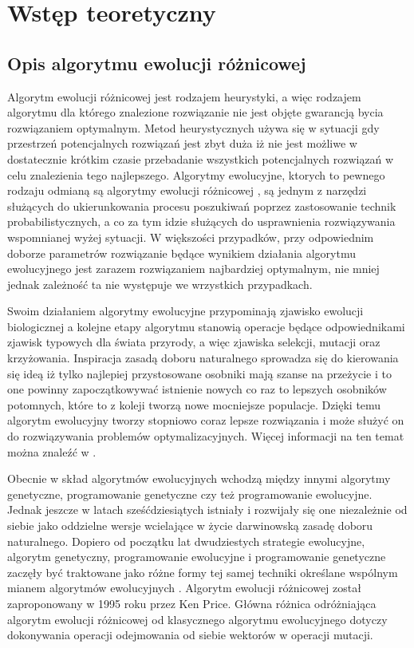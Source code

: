 \chapter{Wstęp teoretyczny}\label{cha:pierwszyDokument}


\section{Opis algorytmu ewolucji różnicowej}\label{sec:strukturaDokumentu}


Algorytm ewolucji różnicowej jest rodzajem heurystyki, a więc rodzajem algorytmu dla którego znalezione rozwiązanie nie jest objęte gwarancją bycia rozwiązaniem optymalnym. Metod heurystycznych używa się w sytuacji gdy przestrzeń potencjalnych rozwiązań jest zbyt duża iż nie jest możliwe w dostatecznie krótkim czasie przebadanie wszystkich  potencjalnych rozwiązań w celu znalezienia tego najlepszego. Algorytmy ewolucyjne, ktorych to pewnego rodzaju odmianą są algorytmy ewolucji różnicowej \cite{diff}, są jednym z narzędzi służących do ukierunkowania procesu poszukiwań poprzez zastosowanie technik probabilistycznych, a co za tym idzie służących do usprawnienia rozwiązywania wspomnianej wyżej sytuacji. W większości przypadków, przy odpowiednim doborze parametrów rozwiązanie będące wynikiem działania algorytmu ewolucyjnego jest zarazem rozwiązaniem najbardziej optymalnym, nie mniej jednak zależność ta nie występuje  we wrzystkich przypadkach.

Swoim działaniem algorytmy ewolucyjne przypominają zjawisko ewolucji biologicznej a kolejne etapy algorytmu stanowią operacje będące odpowiednikami zjawisk typowych dla świata przyrody, a więc zjawiska selekcji, mutacji oraz krzyżowania. Inspiracja zasadą doboru naturalnego sprowadza się do  kierowania się ideą iż tylko najlepiej przystosowane osobniki mają szanse na przeżycie i to one powinny zapoczątkowywać istnienie nowych co raz to lepszych osobników potomnych, które to z koleji tworzą nowe mocniejsze populacje. Dzięki temu algorytm ewolucyjny tworzy stopniowo coraz lepsze rozwiązania i może służyć on do rozwiązywania problemów optymalizacyjnych. Więcej informacji na ten temat można znaleźć w \cite{zeszyty}.

Obecnie w skład algorytmów ewolucyjnych wchodzą między innymi algorytmy genetyczne, programowanie genetyczne czy też programowanie ewolucyjne. Jednak jeszcze w latach sześćdziesiątych istniały i rozwijały się one niezależnie od siebie jako oddzielne wersje wcielające w życie darwinowską zasadę doboru naturalnego. Dopiero od początku lat dwudziestych strategie ewolucyjne, algorytm genetyczny, programowanie ewolucyjne i programowanie genetyczne zaczęły być traktowane jako różne formy tej samej techniki określane wspólnym mianem algorytmów ewolucyjnych \cite{doktorat}.  Algorytm ewolucji różnicowej został zaproponowany w 1995 roku przez Ken Price. Główna różnica odróżniająca algorytm ewolucji różnicowej od klasycznego algorytmu ewolucyjnego dotyczy dokonywania operacji odejmowania od siebie wektorów w operacji mutacji.

